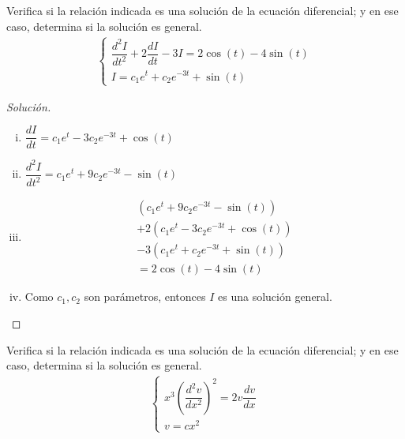 \begin{resuelto}

	Verifica si la relación indicada es una solución de la ecuación diferencial; y en ese caso, determina si la solución es general.
\begin{align}
	\label{problem 2.2:c}
	\begin{cases}
		\dfrac{d^{2}I}{dt^{2}}+2\dfrac{dI}{dt}-3I =
		2\cos(t)-4\sin(t)\\
		I = c_{1}e^{t}+c_{2}e^{-3t}+\sin(t)
	\end{cases}
\end{align}

\end{resuelto}


\begin{proof}[Solución]
	\begin{enumerate}[(i)]
		\item $ \dfrac{dI}{dt}
		=c_{1}e^{t}-3c_{2}e^{-3t}+\cos(t) $

		\item $ \dfrac{d^{2}I}{dt^{2}} =
		c_{1}e^{t}+9c_{2}e^{-3t}-\sin(t) $

		\item
		\begin{align}
			\left(c_{1}e^{t}+9c_{2}e^{-3t}-\sin(t)\right)\\
			+2\left(c_{1}e^{t}-3c_{2}e^{-3t}+\cos(t)\right)\\
			-3\left(c_{1}e^{t}+c_{2}e^{-3t}+\sin(t)\right)\\
			=   2\cos(t)-4\sin(t)
		\end{align}

		\item Como $ c_{1},c_{2} $ son parámetros, entonces $I$ es una solución general.
	\end{enumerate}
\end{proof}


\begin{resuelto}

	Verifica si la relación indicada es una solución de la ecuación diferencial; y en ese caso, determina si la solución es general.
\begin{align}
	\begin{cases}
		x^{3}\left(\dfrac{d^{2}v}{dx^{2}}\right)^{2} = 2v\dfrac{dv}{dx} \\
		v = cx^{2}
	\end{cases}
\end{align}
\end{resuelto}



